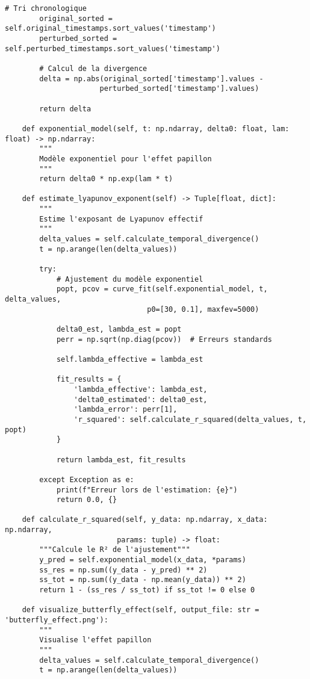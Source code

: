\documentclass[12pt,a4paper]{article}
\begin{document}
\begin{lstlisting}[caption=Modélisation de l'effet papillon forensique]
        # Tri chronologique
        original_sorted = self.original_timestamps.sort_values('timestamp')
        perturbed_sorted = self.perturbed_timestamps.sort_values('timestamp')
        
        # Calcul de la divergence
        delta = np.abs(original_sorted['timestamp'].values - 
                      perturbed_sorted['timestamp'].values)
        
        return delta
    
    def exponential_model(self, t: np.ndarray, delta0: float, lam: float) -> np.ndarray:
        """
        Modèle exponentiel pour l'effet papillon
        """
        return delta0 * np.exp(lam * t)
    
    def estimate_lyapunov_exponent(self) -> Tuple[float, dict]:
        """
        Estime l'exposant de Lyapunov effectif
        """
        delta_values = self.calculate_temporal_divergence()
        t = np.arange(len(delta_values))
        
        try:
            # Ajustement du modèle exponentiel
            popt, pcov = curve_fit(self.exponential_model, t, delta_values, 
                                 p0=[30, 0.1], maxfev=5000)
            
            delta0_est, lambda_est = popt
            perr = np.sqrt(np.diag(pcov))  # Erreurs standards
            
            self.lambda_effective = lambda_est
            
            fit_results = {
                'lambda_effective': lambda_est,
                'delta0_estimated': delta0_est,
                'lambda_error': perr[1],
                'r_squared': self.calculate_r_squared(delta_values, t, popt)
            }
            
            return lambda_est, fit_results
            
        except Exception as e:
            print(f"Erreur lors de l'estimation: {e}")
            return 0.0, {}
    
    def calculate_r_squared(self, y_data: np.ndarray, x_data: np.ndarray, 
                          params: tuple) -> float:
        """Calcule le R² de l'ajustement"""
        y_pred = self.exponential_model(x_data, *params)
        ss_res = np.sum((y_data - y_pred) ** 2)
        ss_tot = np.sum((y_data - np.mean(y_data)) ** 2)
        return 1 - (ss_res / ss_tot) if ss_tot != 0 else 0
    
    def visualize_butterfly_effect(self, output_file: str = 'butterfly_effect.png'):
        """
        Visualise l'effet papillon
        """
        delta_values = self.calculate_temporal_divergence()
        t = np.arange(len(delta_values))
        

\end{lstlisting}
\end{document}
